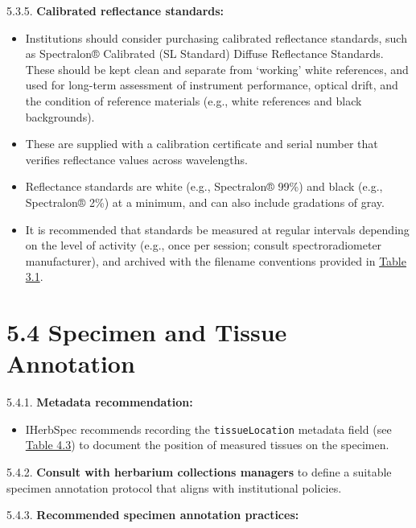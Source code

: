 \documentclass[
  letterpaper,
  DIV=11,
  numbers=noendperiod]{scrreprt}
\providecommand{\tightlist}{%
  \setlength{\itemsep}{0pt}\setlength{\parskip}{0pt}}
\begin{document}
5.3.5. \textbf{Calibrated reflectance standards:}

\begin{itemize}
\tightlist
\item
  Institutions should consider purchasing calibrated reflectance
  standards, such as Spectralon® Calibrated (SL Standard) Diffuse
  Reflectance Standards. These should be kept clean and separate from
  `working' white references, and used for long-term assessment of
  instrument performance, optical drift, and the condition of reference
  materials (e.g., white references and black backgrounds).\\
\item
  These are supplied with a calibration certificate and serial number
  that verifies reflectance values across wavelengths.\\
\item
  Reflectance standards are white (e.g., Spectralon® 99\%) and black
  (e.g., Spectralon® 2\%) at a minimum, and can also include gradations
  of gray.\\
\item
  It is recommended that standards be measured at regular intervals
  depending on the level of activity (e.g., once per session; consult
  spectroradiometer manufacturer), and archived with the filename
  conventions provided in \hyperref[tbl-3-1]{Table 3.1}.
\end{itemize}

\section{5.4 Specimen and Tissue
Annotation}\label{specimen-and-tissue-annotation-1}

5.4.1. \textbf{Metadata recommendation:}

\begin{itemize}
\tightlist
\item
  IHerbSpec recommends recording the \texttt{tissueLocation} metadata
  field (see \hyperref[tbl-4-3]{Table 4.3}) to document the position of
  measured tissues on the specimen.
\end{itemize}

5.4.2. \textbf{Consult with herbarium collections managers} to define a
suitable specimen annotation protocol that aligns with institutional
policies.

5.4.3. \textbf{Recommended specimen annotation practices:}
\end{document}
